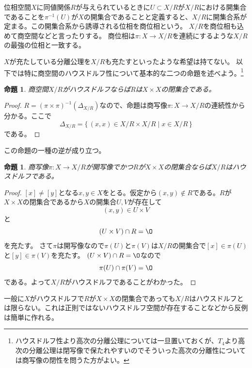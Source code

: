 \documentclass[leqno]{jsarticle}
\newtheorem{prop}[thm]{命題}
\begin{document}
位相空間$X$に同値関係$R$が与えられているときに$U\subset X/R$が$X/R$における開集合であることを$\pi^{-1}(U)$が$X$の開集合であることと定義すると、$X/R$に開集合系が定まる。この開集合系から誘導される位相を商位相という。
$X/R$を商位相も込めて商空間などと言ったりする。
商位相は$\pi:X\to X/R$を連続にするような$X/R$の最強の位相と一致する。
\par
$X$が充たしている分離公理を$X/R$も充たすといったような希望は持てない。
以下では特に商空間のハウスドルフ性について基本的な二つの命題を述べよう。\footnote{ハウスドルフ性より高次の分離公理については一旦置いておくが、$T_4$より高次の分離公理は閉写像で保たれやすいのでそういった高次の分離性については商写像の閉性を問うた方がよい。}
\begin{prop}
商空間$X/R$がハウスドルフならば$R$は$X\times X$の閉集合である。
\end{prop}
\begin{proof}
$R=(\pi\times \pi)^{-1}(\Delta_{X/R})$なので、命題は商写像$\pi:X\to X/R$の連続性から分かる。ここで
\[
\Delta_{X/R}=\{\,(x,x)\in X/R\times X/R\mid x\in X/R\,\}
\]
である。
\end{proof}
この命題の一種の逆が成り立つ。
\begin{prop}\label{aaa}
商写像$\pi:X\to X/R$が開写像でかつ$R$が$X\times X$の閉集合ならば$X/R$はハウスドルフである。
\end{prop}
\begin{proof}
$[x]\neq [y]$となる$x,y\in X$をとる。仮定から$(x,y)\not\in R$である。$R$が$X\times X$の閉集合であるから$X$の開集合$U,V$が存在して
\[
(x,y)\in U\times V
\]
と
\[
(U\times V)\cap R=\O
\]
を充たす。
さて$\pi$は開写像なので$\pi(U)$と$\pi(V)$は$X/R$の開集合で$[x]\in \pi(U)$と$[y]\in \pi(V)$を充たす。
$(U\times V)\cap R=\O$なので
\[
\pi(U)\cap \pi(V)=\O
\]
である。よって$X/R$がハウスドルフであることがわかった。
\end{proof}
一般に$X$がハウスドルフで$R$が$X\times X$の閉集合であっても$X/R$はハウスドルフとは限らない。これは正則ではないハウスドルフ空間が存在することなどから反例は簡単に作れる。
\end{document}
